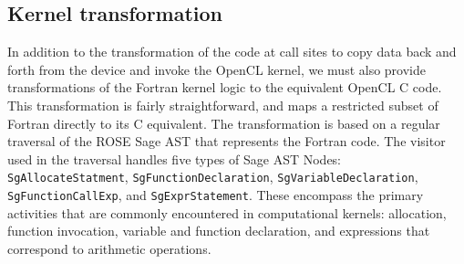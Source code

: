 \subsection{Kernel transformation}

In addition to the transformation of the code at call sites to copy
data back and forth from the device and invoke the OpenCL kernel, we
must also provide transformations of the Fortran kernel logic to the
equivalent OpenCL C code.  This transformation is fairly
straightforward, and maps a restricted subset of Fortran directly to
its C equivalent.  The transformation is based on a regular traversal
of the ROSE Sage AST that represents the Fortran code.  The visitor
used in the traversal handles five types of Sage AST Nodes: {\tt
  SgAllocateStatment}, {\tt SgFunctionDeclaration},
{\tt SgVariableDeclaration}, {\tt SgFunctionCallExp}, and
{\tt SgExprStatement}.  These encompass the primary activities that are
commonly encountered in computational kernels: allocation, function invocation,
variable and function declaration, and expressions that correspond to
arithmetic operations.


